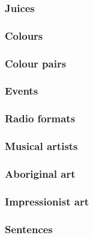 \documentclass[11pt,letter]{article}
\begin{document}


\subsubsection{Juices}



\subsubsection{Colours}



\subsubsection{Colour pairs}



\subsubsection{Events}



\subsubsection{Radio formats}



\subsubsection{Musical artists}



\subsubsection{Aboriginal art}



\subsubsection{Impressionist art}



\subsubsection{Sentences}
\end{document}
